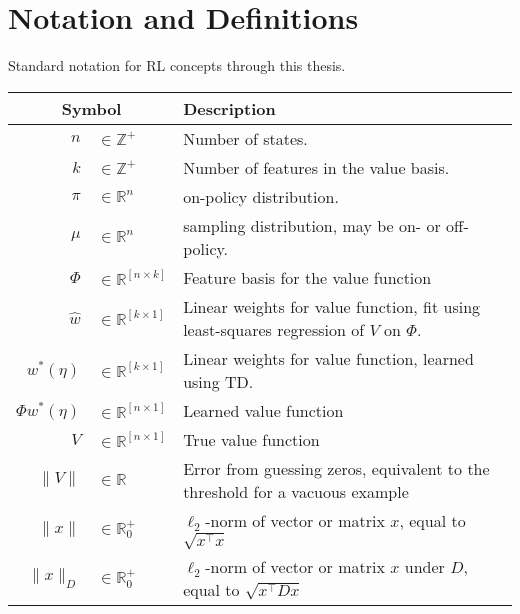 \chapter{Notation and Definitions}

Standard notation for RL concepts through this thesis.

\begin{longtable}{rl p{4in}}\hline\hline
	\multicolumn{2}{c}{Symbol} & Description
	\\\hline\endhead
	$n$                        & $\in\mathbb Z^+$ & Number of states.
	\\  $k$ & $\in\mathbb Z^+$ & Number of features in the value basis.
	\\  $\pi$ & $\in\mathbb R^{n}$ & on-policy distribution.
	\\  $\mu$ & $\in\mathbb R^{n}$ & sampling distribution, may be on- or off-policy.
	\\  $\Phi$ & $\in \mathbb R^{[n\times k]}$ & Feature basis for the value function
	\\  $\hat w$ & $\in \mathbb R^{[k\times 1]}$ & Linear weights for value function, fit using least-squares regression of $V$ on $\Phi$.
	\\  $w^*(\eta)$ & $\in \mathbb R^{[k\times 1]}$ & Linear weights for value function, learned using TD.
	\\  $\Phi w^*(\eta)$ & $\in \mathbb R^{[n\times 1]}$ & Learned value function
	\\  $V$ & $\in \mathbb R^{[n\times 1]}$ & True value function
	\\  $\|V\|$ & $\in \mathbb R$ & Error from guessing zeros, equivalent to the threshold for a vacuous example
	\\  $\|x\|$ & $\in\mathbb R^+_0$ & $\ell_2$-norm of vector or matrix $x$, equal to $\sqrt{x^\top x}$
	\\  $\|x\|_D$ & $\in\mathbb R^+_0$ & $\ell_2$-norm of vector or matrix $x$ under $D$, equal to $\sqrt{x^\top D x}$
	\\ \hline\hline
\end{longtable}

\clearpage
